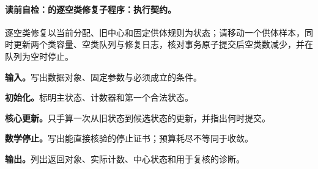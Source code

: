 \begingroup
\addtocounter{algocf}{-1}
\renewcommand{\thealgocf}{\thechapter.\arabic{algocf}B}
\paragraph{读前自检：的逐空类修复子程序：执行契约。}\kMeans{}逐空类修复以当前分配、旧中心和固定供体规则为状态；请移动一个供体样本，同时更新两个类容量、空类队列与修复日志，核对事务原子提交后空类数减少，并在队列为空时停止。\par
\begin{keypointbox}[title={的逐空类修复子程序：五步阅读}]
\textbf{输入。}写出数据对象、固定参数与必须成立的条件。\par
\textbf{初始化。}标明主状态、计数器和第一个合法状态。\par
\textbf{核心更新。}只手算一次从旧状态到候选状态的更新，并指出何时提交。\par
\textbf{数学停止。}写出能直接核验的停止证书；预算耗尽不等同于收敛。\par
\textbf{输出。}列出返回对象、实际计数、中心状态和用于复核的诊断。
\end{keypointbox}

